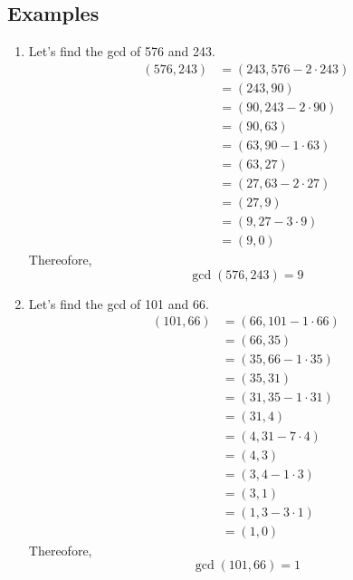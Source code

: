 \documentclass[11pt]{article}
\begin{document}
\subsection{Examples}
\begin{enumerate}
    \item Let's find the gcd of 576 and 243.\begin{align*}
              (576, 243) & = (243, 576 - 2 \cdot 243) \\
                         & = (243, 90)                \\
                         & = (90, 243 - 2 \cdot 90)   \\
                         & = (90, 63)                 \\
                         & = (63, 90 - 1 \cdot 63)    \\
                         & = (63, 27)                 \\
                         & = (27, 63 - 2 \cdot 27)    \\
                         & = (27, 9)                  \\
                         & = (9, 27 - 3 \cdot 9)      \\
                         & = (9, 0)
          \end{align*}
          Thereofore,
          \[
              \gcd(576,243) = 9
          \]

    \item Let's find the gcd of 101 and 66.
          \begin{align*}
              (101, 66) & = (66, 101 - 1 \cdot 66) \\
                        & = (66, 35)               \\
                        & = (35, 66 - 1 \cdot 35)  \\
                        & = (35, 31)               \\
                        & = (31, 35 - 1 \cdot 31)  \\
                        & = (31, 4)                \\
                        & = (4, 31 - 7 \cdot 4)    \\
                        & = (4, 3)                 \\
                        & = (3, 4 - 1 \cdot 3)     \\
                        & = (3, 1)                 \\
                        & = (1, 3 - 3 \cdot 1)     \\
                        & = (1, 0)
          \end{align*}
          Thereofore,
          \[
              \gcd(101,66) = 1
          \]


\end{enumerate}
\end{document}
